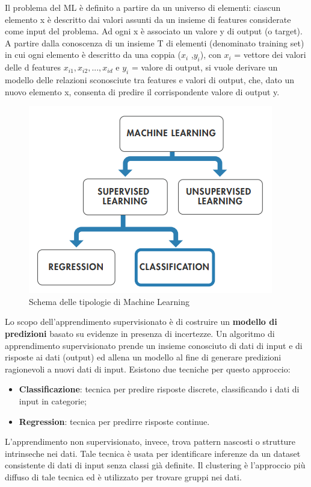 Il problema del ML è definito a partire da un universo di elementi: ciascun elemento x è descritto dai valori assunti da un insieme di features considerate come input del problema. Ad ogni x è associato un valore y di output (o target). A partire dalla conoscenza di un insieme T di elementi (denominato training set) in cui ogni elemento è descritto da una coppia ($x_i$ ,$y_i$), con $x_i$ = vettore dei valori delle d features $x_{i1}, x_{i2}, ... , x_{id}$ e $y_i$ = valore di output, si vuole derivare un modello delle relazioni sconosciute tra features e valori di output, che, dato un nuovo elemento x, consenta di predire il corrispondente valore di output y. 
\begin{figure}[]
	\centering
	\includegraphics[scale=1]{images/Tipologie_Machine_Learning.png}
	\caption{Schema delle tipologie di Machine Learning}
\end{figure}
Lo scopo dell'apprendimento supervisionato è di costruire un \textbf{modello di predizioni} basato su evidenze in presenza di incertezze. Un algoritmo di apprendimento supervisionato prende un insieme conosciuto di dati di input e di risposte ai dati (output) ed allena un modello al fine di generare predizioni ragionevoli a nuovi dati di input. Esistono due tecniche per questo approccio:
\begin{itemize}
	\item \textbf{Classificazione}: tecnica per predire risposte discrete, classificando i dati di input in categorie;
	\item \textbf{Regression}: tecnica per predirre risposte continue.
\end{itemize}
L'apprendimento non supervisionato, invece, trova pattern nascosti o strutture intrinseche nei dati. Tale tecnica è usata per identificare inferenze da un dataset consistente di dati di input senza classi già definite. Il clustering è l'approccio più diffuso di tale tecnica ed è utilizzato per trovare gruppi nei dati.\\
